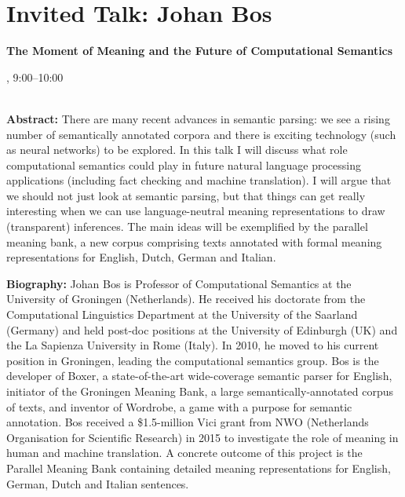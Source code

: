 \section{Invited Talk: Johan Bos}

\begin{center}
\begin{Large}
    {\bfseries\Large The Moment of Meaning and the Future of Computational Semantics} 
\vspace{1em}\par
\end{Large}

\daydateyear, 9:00--10:00 \vspace{1em}\\
\PlenaryLoc \\
\vspace{1em}\par
\end{center}

\noindent
{\bfseries Abstract:} There are many recent advances in semantic parsing: we see a rising number of semantically annotated corpora and there is exciting technology (such as neural networks) to be explored. In this talk I will discuss what role computational semantics could play in future natural language processing applications (including fact checking and machine translation). I will argue that we should not just look at semantic parsing, but that things can get really interesting when we can use language-neutral meaning representations to draw (transparent) inferences. The main ideas will be exemplified by the parallel meaning bank, a new corpus comprising texts annotated with formal meaning representations for English, Dutch, German and Italian.

\vspace{3em}\par 

\vfill
\noindent

{\bfseries Biography:} 
Johan Bos is Professor of Computational Semantics at the University of Groningen (Netherlands). He received his doctorate from the Computational Linguistics Department at the University of the Saarland (Germany) and held post-doc positions at the University of Edinburgh (UK) and the La Sapienza University in Rome (Italy). In 2010, he moved to his current position in Groningen, leading the computational semantics group. Bos is the developer of Boxer, a state-of-the-art wide-coverage semantic parser for English, initiator of the Groningen Meaning Bank, a large semantically-annotated corpus of texts, and inventor of Wordrobe, a game with a purpose for semantic annotation. Bos received a \$1.5-million Vici grant from NWO (Netherlands Organisation for Scientific Research) in 2015 to investigate the role of meaning in human and machine translation. A concrete outcome of this project is the Parallel Meaning Bank containing detailed meaning representations for English, German, Dutch and Italian sentences.

\newpage

